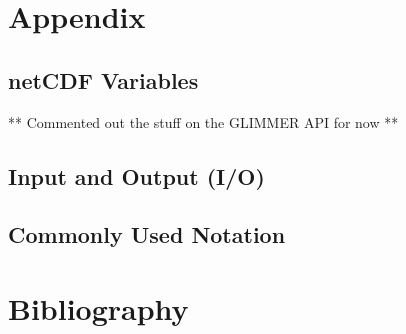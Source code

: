 %

%

%

\part{Appendix}
\label{ch:appendix}
\appendix
\renewcommand{\dir}{ug}
\chapter{netCDF Variables}
\label{ch:appendix_vars}

** Commented out the stuff on the GLIMMER API for now **
%
%
%
\renewcommand{\dir}{ext}


%

\chapter{Input and Output (I/O)}
\label{ch:appendix_io}
\renewcommand{\dir}{dg}


\chapter{Commonly Used Notation}
\label{ch:notation}
\renewcommand{\dir}{appendix}


\part{Bibliography}



